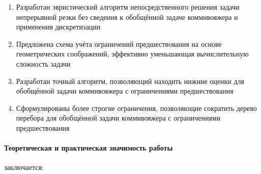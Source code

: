 \begin{enumerate}
    \item 
    Разработан эвристический алгоритм непосредственного решения 
    задачи непрерывной резки без сведения к обобщённой
    задаче коммивояжера и применения дискретизации
    \item 
    Предложена схема учёта ограничений предшествования на основе 
    геометрических соображений,
    эффективно уменьшающая вычислительную сложность задачи 
    \item 
    Разработан точный алгоритм,
    позволяющий находить нижние оценки для 
    обобщённой задачи коммивояжера с ограничениями предшествования
    \item
    Сформулированы более строгие ограничения,
    позволяющие сократить дерево перебора для обобщённой
    задачи коммивояжера с ограничениями предшествования
\end{enumerate}

\paragraph*{Теоретическая и практическая значимость работы} заключается:

